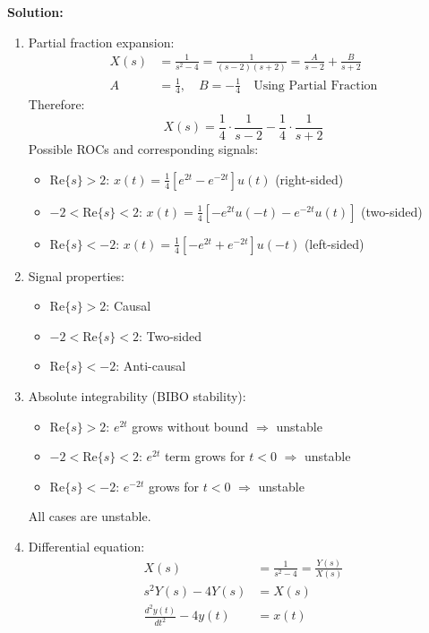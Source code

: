 \documentclass{article}
\begin{document}
\textbf{Solution:}
\begin{enumerate}[label=(\alph*)]
    \item Partial fraction expansion:
    \begin{align*}
        X(s) &= \frac{1}{s^2 - 4} = \frac{1}{(s - 2)(s + 2)} = \frac{A}{s - 2} + \frac{B}{s + 2} \\
        A & = \frac{1}{4}, \quad B = -\frac{1}{4} \quad \text{Using Partial Fraction}
    \end{align*}
    Therefore:
    \[ X(s) = \frac{1}{4} \cdot \frac{1}{s - 2} - \frac{1}{4} \cdot \frac{1}{s + 2} \]
    Possible ROCs and corresponding signals:
    \begin{itemize}
        \item $\text{Re}\{s\} > 2$: $x(t) = \frac{1}{4}[e^{2t} - e^{-2t}]u(t)$ (right-sided)
        \item $-2 < \text{Re}\{s\} < 2$: $x(t) = \frac{1}{4}[-e^{2t}u(-t) - e^{-2t}u(t)]$ (two-sided)
        \item $\text{Re}\{s\} < -2$: $x(t) = \frac{1}{4}[-e^{2t} + e^{-2t}]u(-t)$ (left-sided)
    \end{itemize}
    
    \item Signal properties:
    \begin{itemize}
        \item $\text{Re}\{s\} > 2$: Causal
        \item $-2 < \text{Re}\{s\} < 2$: Two-sided
        \item $\text{Re}\{s\} < -2$: Anti-causal
    \end{itemize}
    
    \item Absolute integrability (BIBO stability):
    \begin{itemize}
        \item $\text{Re}\{s\} > 2$: $e^{2t}$ grows without bound $\Rightarrow$ unstable
        \item $-2 < \text{Re}\{s\} < 2$: $e^{2t}$ term grows for $t < 0$ $\Rightarrow$ unstable
        \item $\text{Re}\{s\} < -2$: $e^{-2t}$ grows for $t < 0$ $\Rightarrow$ unstable
    \end{itemize}
    All cases are unstable.
    
    \item Differential equation:
    \begin{align*}
        X(s) &= \frac{1}{s^2 - 4} = \frac{Y(s)}{X(s)} \\
        s^2Y(s) - 4Y(s) &= X(s) \\
        \frac{d^2y(t)}{dt^2} - 4y(t) &= x(t)
    \end{align*}
\end{enumerate}
\end{document}
